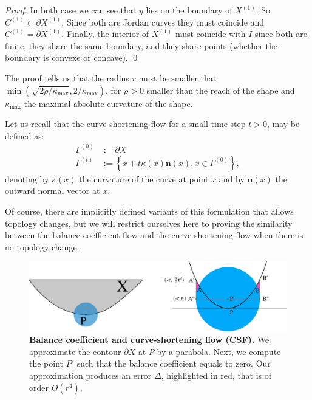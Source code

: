 \documentclass[smallextended]{svjour3}
\begin{document}
\begin{proof}
  In both case we can see that $y$ lies on the boundary of
  $X^{(1)}$. So $C^{(1)} \subset \partial X^{(1)}$. Since both
  are Jordan curves they must coincide and $C^{(1)} = \partial
  X^{(1)}$.  Finally, the interior of $X^{(1)}$ must coincide with
  $I$ since both are finite, they share the same boundary, and they
  share points (whether the boundary is convexe or concave).
  \qed
\end{proof}

The proof tells us that the radius $r$ must be smaller that
$\min(\sqrt{2\rho / \kappa_{\max}},2 / \kappa_{\max})$, for $\rho>0$
smaller than the reach of the shape and $\kappa_{\max}$ the maximal
absolute curvature of the shape.

Let us recall that the curve-shortening flow for a small time step
$t>0$, may be defined as:
\begin{align}
  \Gamma^{(0)} & := \partial X \nonumber \\
  \Gamma^{(t)} & := \left\{ x + t\kappa(x)\mathbf{n}(x), x \in \Gamma^{(0)} \right\}, \label{eq-csf}
\end{align}
denoting by $\kappa(x)$ the curvature of the curve at point $x$
and by $\mathbf{n}(x)$ the outward normal vector at $x$.

Of course, there are implicitly defined variants of this formulation
that allows topology changes, but we will restrict ourselves here to
proving the similarity between the balance coefficient flow and the
curve-shortening flow when there is no topology change.


%
\begin{figure}
\center
\includegraphics[scale=0.75]{figures/analysis-error/geometry-argument.png}
\caption{\textbf{Balance coefficient and curve-shortening flow (CSF).} We approximate the contour $\partial X$ at $P$ by a parabola. Next, we compute the point $P'$ such that the balance coefficient equals to zero. Our approximation produces an error $\Delta$, highlighted in red, that is of order $O(r^4)$. \label{fig:geometric-argument}}
\end{figure}
%
\end{document}
